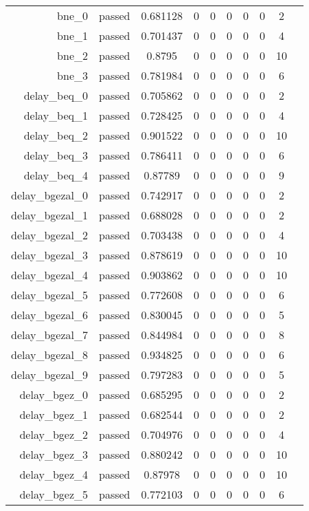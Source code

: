 \begin{longtable}{r|ccccccccc}
    bne\_0 & passed & 0.681128 & 0 & 0 & 0 & 0 & 0 & 2 \\
    bne\_1 & passed & 0.701437 & 0 & 0 & 0 & 0 & 0 & 4 \\
    bne\_2 & passed & 0.8795 & 0 & 0 & 0 & 0 & 0 & 10 \\
    bne\_3 & passed & 0.781984 & 0 & 0 & 0 & 0 & 0 & 6 \\
    delay\_beq\_0 & passed & 0.705862 & 0 & 0 & 0 & 0 & 0 & 2 \\
    delay\_beq\_1 & passed & 0.728425 & 0 & 0 & 0 & 0 & 0 & 4 \\
    delay\_beq\_2 & passed & 0.901522 & 0 & 0 & 0 & 0 & 0 & 10 \\
    delay\_beq\_3 & passed & 0.786411 & 0 & 0 & 0 & 0 & 0 & 6 \\
    delay\_beq\_4 & passed & 0.87789 & 0 & 0 & 0 & 0 & 0 & 9 \\
    delay\_bgezal\_0 & passed & 0.742917 & 0 & 0 & 0 & 0 & 0 & 2 \\
    delay\_bgezal\_1 & passed & 0.688028 & 0 & 0 & 0 & 0 & 0 & 2 \\
    delay\_bgezal\_2 & passed & 0.703438 & 0 & 0 & 0 & 0 & 0 & 4 \\
    delay\_bgezal\_3 & passed & 0.878619 & 0 & 0 & 0 & 0 & 0 & 10 \\
    delay\_bgezal\_4 & passed & 0.903862 & 0 & 0 & 0 & 0 & 0 & 10 \\
    delay\_bgezal\_5 & passed & 0.772608 & 0 & 0 & 0 & 0 & 0 & 6 \\
    delay\_bgezal\_6 & passed & 0.830045 & 0 & 0 & 0 & 0 & 0 & 5 \\
    delay\_bgezal\_7 & passed & 0.844984 & 0 & 0 & 0 & 0 & 0 & 8 \\
    delay\_bgezal\_8 & passed & 0.934825 & 0 & 0 & 0 & 0 & 0 & 6 \\
    delay\_bgezal\_9 & passed & 0.797283 & 0 & 0 & 0 & 0 & 0 & 5 \\
    delay\_bgez\_0 & passed & 0.685295 & 0 & 0 & 0 & 0 & 0 & 2 \\
    delay\_bgez\_1 & passed & 0.682544 & 0 & 0 & 0 & 0 & 0 & 2 \\
    delay\_bgez\_2 & passed & 0.704976 & 0 & 0 & 0 & 0 & 0 & 4 \\
    delay\_bgez\_3 & passed & 0.880242 & 0 & 0 & 0 & 0 & 0 & 10 \\
    delay\_bgez\_4 & passed & 0.87978 & 0 & 0 & 0 & 0 & 0 & 10 \\
    delay\_bgez\_5 & passed & 0.772103 & 0 & 0 & 0 & 0 & 0 & 6 \\

\end{longtable}
